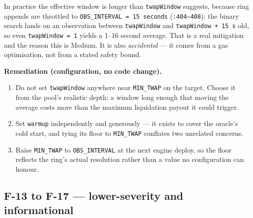 \documentclass[11pt,a4paper]{article}
\newcommand{\code}[1]{\texttt{\small #1}}
\newcommand{\fileref}[1]{\texttt{\scriptsize #1}}
\begin{document}
In practice the effective window is longer than \code{twapWindow} suggests, because
ring appends are throttled to \code{OBS\_INTERVAL = 15 seconds}
(\fileref{:404--408}): the binary search lands on an observation between
\code{twapWindow} and \code{twapWindow + 15\,s} old, so even
\code{twapWindow = 1} yields a 1--16 second average. That is a real mitigation and
the reason this is Medium. It is also \emph{accidental} --- it comes from a gas
optimisation, not from a stated safety bound.

\textbf{Remediation (configuration, no code change).}
\begin{enumerate}
\item Do not set \code{twapWindow} anywhere near \code{MIN\_TWAP} on the target.
Choose it from the pool's realistic depth: a window long enough that moving the
average costs more than the maximum liquidation payout it could trigger.
\item Set \code{warmup} independently and generously --- it exists to cover the
oracle's cold start, and tying its floor to \code{MIN\_TWAP} conflates two
unrelated concerns.
\item Raise \code{MIN\_TWAP} to \code{OBS\_INTERVAL} at the next engine deploy, so
the floor reflects the ring's actual resolution rather than a value no
configuration can honour.
\end{enumerate}

\newpage
\subsection{F-13 to F-17 --- lower-severity and informational}
\end{document}
